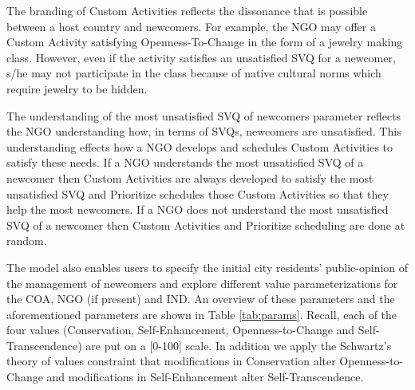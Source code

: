 \documentclass{scspaperproc}
\theoremstyle{scsthe}
\begin{document}
The branding of Custom Activities reflects the dissonance that is possible between a host country and newcomers. For example, the NGO may offer a Custom Activity satisfying Openness-To-Change in the form of a jewelry making class. However, even if the activity satisfies an unsatisfied SVQ for a newcomer, s/he may not participate in the class because of native cultural norms which require jewelry to be hidden. 

The understanding of the most unsatisfied SVQ of newcomers parameter reflects the NGO understanding how, in terms of SVQs, newcomers are unsatisfied. This understanding effects how a NGO develops and schedules Custom Activities to satisfy these needs. If a NGO understands the most unsatisfied SVQ of a newcomer then Custom Activities are always developed to satisfy the most unsatisfied SVQ and Prioritize schedules those Custom Activities so that they help the most newcomers. If a NGO does not understand the most unsatisfied SVQ of a newcomer then Custom Activities and Prioritize scheduling are done at random.

The model also enables users to specify the initial city residents' public-opinion of the management of newcomers and explore different value parameterizations for the COA, NGO (if present) and IND. An overview of these parameters and the aforementioned parameters are shown in Table \ref{tab:params}. Recall, each of the four values (Conservation, Self-Enhancement, Openness-to-Change and Self-Transcendence) are put on a [0-100] scale. In addition we apply the Schwartz's theory of values constraint that modifications in Conservation alter Openness-to-Change and modifications in Self-Enhancement alter Self-Transcendence.
\end{document}
